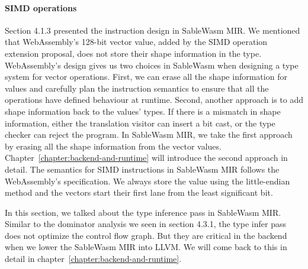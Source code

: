 \paragraph{SIMD operations}
Section 4.1.3 presented the instruction design in SableWasm MIR. We mentioned
that WebAssembly's 128-bit vector value, added by the SIMD operation extension
proposal, does not store their shape information in the type. WebAssembly's
design gives us two choices in SableWasm when designing a type system for vector
operations. First, we can erase all the shape information for values and
carefully plan the instruction semantics to ensure that all the operations
have defined behaviour at runtime. Second, another approach is to add shape
information back to the values' types. If there is a mismatch in shape
information, either the translation visitor can insert a bit cast, or the type
checker can reject the program. In SableWasm MIR, we take the first approach by
erasing all the shape information from the vector values.
Chapter~\ref{chapter:backend-and-runtime} will introduce the second approach in
detail. The semantics for SIMD instructions in SableWasm MIR follows the
WebAssembly's specification. We always store the value using the little-endian
method and the vectors start their first lane from the least significant bit.

In this section, we talked about the type inference pass in SableWasm MIR.
Similar to the dominator analysis we seen in section 4.3.1, the type infer pass
does not optimize the control flow graph. But they are critical in the backend
when we lower the SableWasm MIR into LLVM. We will come back to this in detail
in chapter~\ref{chapter:backend-and-runtime}.
